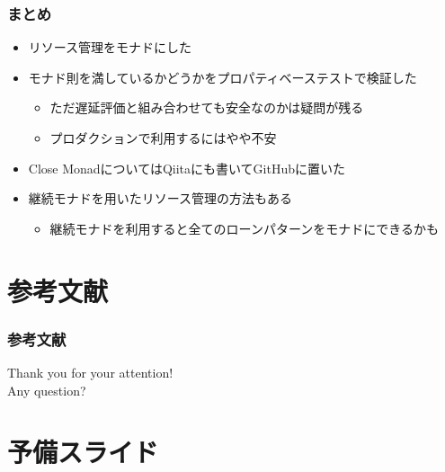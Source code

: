 \begin{frame}
  \frametitle{まとめ}

  \begin{itemize}
    \item<2-> リソース管理をモナドにした
    \item<3-> モナド則を満しているかどうかをプロパティベーステストで検証した
    \begin{itemize}
      \item<4-> ただ遅延評価と組み合わせても安全なのかは疑問が残る
      \item<5-> プロダクションで利用するにはやや不安
    \end{itemize}
    \item<6-> Close MonadについてはQiitaにも書いてGitHubに置いた\cite{closemonad,closemonadgithub}
    \item<7-> 継続モナドを用いたリソース管理の方法もある\cite{tanakh2015,jwhaco2017}
    \begin{itemize}
      \item 継続モナドを利用すると全てのローンパターンをモナドにできるかも
    \end{itemize}
  \end{itemize}
\end{frame}

\section{参考文献}

\begin{frame}[allowframebreaks]
  \frametitle{参考文献}

  
  \nocite{*}

  
\end{frame}

\begin{frame}
  \centering
  {\Huge Thank you for your attention!\\
    \vspace{1em}
    Any question?
  }
\end{frame}



\section*{予備スライド}

